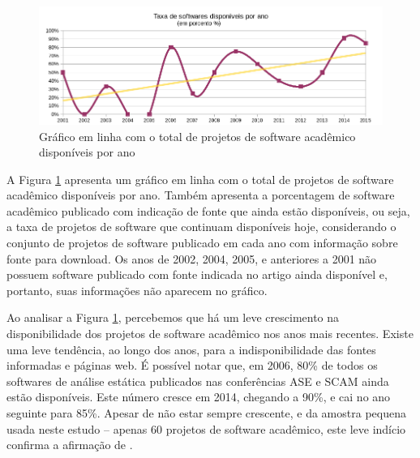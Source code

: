 
\begin{figure}[h]
  \center
  \includegraphics[scale=0.65]{imagens/softwares-disponivel-por-ano.png}
  \caption{Gráfico em linha com o total de projetos de software acadêmico disponíveis por ano}
  \label{softwares-disponivel-por-ano}
\end{figure}

A Figura \ref{softwares-disponivel-por-ano} apresenta 
um gráfico em linha com o total de projetos de software acadêmico disponíveis por ano.
Também apresenta a porcentagem de software acadêmico publicado com indicação de fonte que ainda estão
disponíveis, ou seja, a taxa de projetos de software que continuam
disponíveis hoje, considerando o conjunto de projetos de software publicado em cada ano 
com informação sobre fonte para download. 
Os anos de 2002, 2004, 2005, e anteriores a 2001 não possuem software publicado
com fonte indicada no artigo ainda disponível e, portanto,
suas informações não aparecem no gráfico.

Ao analisar a Figura \ref{softwares-disponivel-por-ano},
percebemos que há um leve crescimento na disponibilidade
dos projetos de software acadêmico  nos anos mais recentes.
%
Existe uma leve tendência, ao longo dos anos,  
para a indisponibilidade das fontes informadas e páginas web.
É possível notar que, em 2006, 80\% de todos os
softwares de análise estática publicados nas conferências ASE e SCAM ainda estão disponíveis.
Este número cresce em 2014, chegando a 90\%, e cai no ano seguinte para 85\%.
Apesar de não estar sempre crescente, e da  amostra pequena usada neste estudo 
-- apenas 60 projetos de software acadêmico,
este leve indício confirma a afirmação de .

